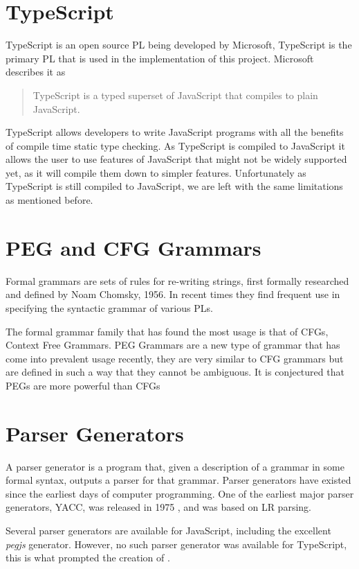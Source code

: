 \section{TypeScript}
TypeScript is an open source PL being developed by Microsoft, TypeScript is the primary PL that is used in the implementation of this project. Microsoft describes it as

\begin{quote}
TypeScript is a typed superset of JavaScript that compiles to plain JavaScript.\cite{microsoftts}
\end{quote}

TypeScript allows developers to write JavaScript programs with all the benefits of compile time static type checking. As TypeScript is compiled to JavaScript it allows the user to use features of JavaScript that might not be widely supported yet, as it will compile them down to simpler features. Unfortunately as TypeScript is still compiled to JavaScript, we are left with the same limitations as mentioned before.

\section{PEG and CFG Grammars}

Formal grammars are sets of rules for re-writing strings, first formally researched and defined by Noam Chomsky, 1956\cite{chomskypaper}. In recent times they find frequent use in specifying the syntactic grammar of various PLs.

The formal grammar family that has found the most usage is that of CFGs, Context Free Grammars. PEG Grammars are a new type of grammar that has come into prevalent usage recently, they are very similar to CFG grammars but are defined in such a way that they cannot be ambiguous. It is conjectured that PEGs are more powerful than CFGs\cite{pegconjecture}

\section{Parser Generators}

A parser generator is a program that, given a description of a grammar in some formal syntax, outputs a parser for that grammar. Parser generators have existed since the earliest days of computer programming. One of the earliest major parser generators, YACC, was released in 1975 \cite{yacc}, and was based on LR parsing.

Several parser generators are available for JavaScript, including the excellent \emph{pegjs} generator. However, no such parser generator was available for TypeScript, this is what prompted the creation of \tsPEG{}.

